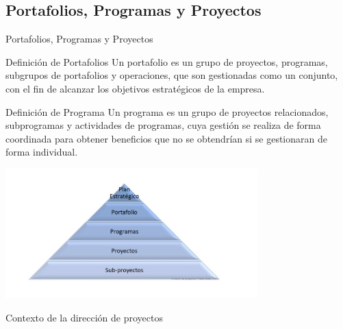\subsection{Portafolios, Programas y Proyectos}
\begin{frame}[allowframebreaks]{Portafolios, Programas y Proyectos}
	
	\begin{block}{Definición de Portafolios}
		Un portafolio es un grupo de proyectos, programas, subgrupos de  portafolios y operaciones, que son gestionadas como un conjunto, con el fin de alcanzar los objetivos estratégicos de la empresa.
	\end{block}


	\framebreak

	\begin{block}{Definición de Programa}
		Un programa es un grupo de proyectos relacionados, subprogramas y actividades de programas, cuya gestión se realiza de forma coordinada para obtener beneficios que no se obtendrían si se gestionaran de forma individual.
	\end{block}


	\framebreak
	\begin{center}
		\includegraphics[height=5cm]{figuras/proy_prog_port_00.png}

		Contexto de la dirección de proyectos
	\end{center}

\end{frame}


